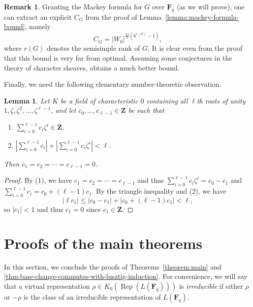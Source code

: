 \documentclass[11pt,reqno]{amsart}
\newtheorem{lemma}[theorem]{Lemma}
\theoremstyle{definition}
\newtheorem{remark}[theorem]{Remark}
\newcommand{\F}{{\mathbf F}}
\newcommand{\Z}{{\mathbf Z}}
\DeclareMathOperator{\Rep}{Rep}
\begin{document}
\begin{remark}
    Granting the Mackey formula for $G$ over $\F_q$ (as we will prove), one can extract an explicit $C_G$ from the proof of Lemma~\ref{lemma:mackey-formula-bound}, namely
    \[
    C_G = |W_0|^{\frac{13}{5}(6^{r(G)}-1)},
    \]
    where $r(G)$ denotes the semisimple rank of $G$. It is clear even from the proof that this bound is very far from optimal. Assuming some conjectures in the theory of character sheaves, \cite[Proposition 13.2]{TT20} obtains a much better bound.
\end{remark}

Finally, we need the following elementary number-theoretic observation.

\begin{lemma}\label{lemma:elementary-number-theory}
    Let $K$ be a field of characteristic $0$ containing all $\ell$th roots of unity $1, \zeta, \zeta^2, \dots, \zeta^{\ell-1}$, and let $c_0, \dots, c_{\ell-1} \in \Z$ be such that
    \begin{enumerate}
        \item $\sum_{i=0}^{\ell-1} c_i\zeta^i \in \Z$,
        \item $\left|\sum_{i=0}^{\ell-1}c_i\right| + \left|\sum_{i=0}^{\ell-1} c_i\zeta^i\right| < \ell$.
    \end{enumerate}
    Then $c_1 = c_2 = \cdots = c_{\ell-1} = 0$.
\end{lemma}

\begin{proof}
    By (1), we have $c_1 = c_2 = \cdots = c_{\ell-1}$ and thus $\sum_{i=0}^{\ell-1} c_i\zeta^i = c_0 - c_1$ and $\sum_{i=0}^{\ell-1} c_i = c_0 + (\ell-1)c_1$.
    By the triangle inequality and (2), we have
    \[
    |\ell c_1| \leq |c_0 - c_1| + |c_0 + (\ell-1)c_1| < \ell,
    \]
    so $|c_1| < 1$ and thus $c_1 = 0$ since $c_1 \in \Z$.
\end{proof}



\section{Proofs of the main theorems}

In this section, we conclude the proofs of Theorems~\ref{theorem:main} and \ref{thm:base-change-commutes-with-lusztig-induction}. For convenience, we will say that a virtual representation $\rho \in K_0(\Rep(L(\F_q)))$ is \emph{irreducible} if either $\rho$ or $-\rho$ is the class of an irreducible representation of $L(\F_q)$.
\end{document}
